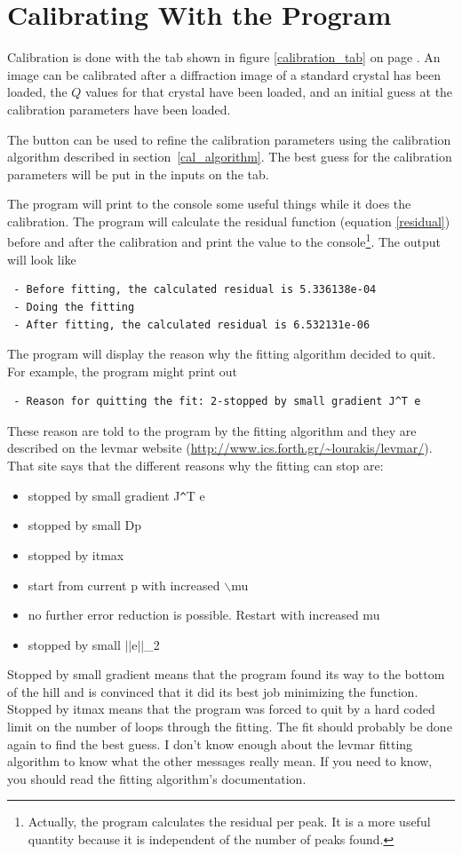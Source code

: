 \section{Calibrating With the Program}

Calibration is done with the
 tab shown 
in figure \ref{calibration_tab} on page
\pageref{calibration_tab}. An image
can be calibrated after a diffraction
image of a standard crystal has been loaded, the $Q$ values for that
crystal have been loaded, and an initial guess 
at the calibration parameters have been loaded.

The 
button can be used to refine the calibration parameters using the 
calibration algorithm described in section~\ref{cal_algorithm}. 
The best guess for the calibration parameters will be put in
the inputs on the  tab.

The program will print to the console some useful things
while it does the calibration. The program will calculate the residual 
function (equation \ref{residual}) before and 
after the calibration and print the value to the
console\footnote{Actually, the program
calculates the residual per peak. 
It is a more useful quantity because it is independent
of the number of peaks found.}. The output will look like
\begin{lstlisting}
 - Before fitting, the calculated residual is 5.336138e-04
 - Doing the fitting
 - After fitting, the calculated residual is 6.532131e-06
\end{lstlisting}
The program will display the reason why the fitting
algorithm decided to quit. For example, the program
might print out
\begin{lstlisting}
 - Reason for quitting the fit: 2-stopped by small gradient J^T e
\end{lstlisting}
These reason are told to the program by the fitting
algorithm and they are described on the levmar website
(\url{http://www.ics.forth.gr/~lourakis/levmar/}).
That site says that the different reasons why the
fitting can stop are:
\begin{itemize}
    \item stopped by small gradient J\verb!^!T e
    \item stopped by small Dp
    \item stopped by itmax
    \item start from current p with increased $\backslash$mu
    \item no further error reduction is possible. 
    Restart with increased mu
    \item stopped by small $||$e$||$\_2\cite{lourakis04LM}
\end{itemize}
Stopped by small gradient means that the program found its way
to the bottom of the hill and is convinced that it did its best
job minimizing the function. Stopped by itmax
means that the program was forced to quit by a hard coded limit
on the number of loops through the fitting. The fit should
probably be done again to find the best guess.
I don't know enough about the levmar fitting algorithm to know 
what the other messages really mean. If you need to know, you 
should read the fitting algorithm's documentation. 

